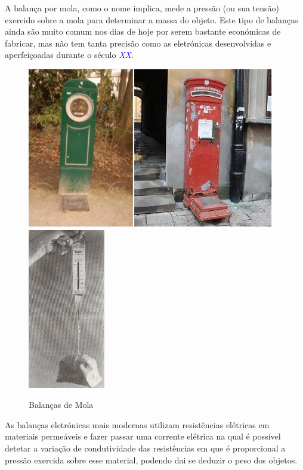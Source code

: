 A balança por mola, como o nome implica, mede a pressão (ou sua tensão) exercido sobre a mola para determinar a massa do objeto. Este tipo de balanças ainda são muito comum nos dias de hoje por serem bastante económicas de fabricar, mas não tem tanta precisão como as eletrónicas desenvolvidas e aperfeiçoadas durante o século \textcolor{blue}{\textit{XX}}.
\newline
\newline
\begin{minipage}[!b]{\linewidth}
	\begin{figure}[H]
		\captionsetup{justification=raggedright,singlelinecheck=false}
		\flushleft
		\includegraphics[height=7cm]{./image/PESTA/general/Public_Body_Scales_1.jpg}
		\hspace{.8cm}
		\includegraphics[height=7cm]{./image/PESTA/general/Balanca_Mola_1.jpg}
		\caption{Balanças de Mola}
		\label{Balanca_Mola_1}
	\end{figure}
\end{minipage}
\newpage
As balanças eletrónicas mais modernas utilizam resistências elétricas em materiais permeáveis e fazer passar uma corrente elétrica na qual é possível detetar a variação de condutividade das resistências em que é proporcional a pressão exercida sobre esse material, podendo dai se deduzir o peso dos objetos.
